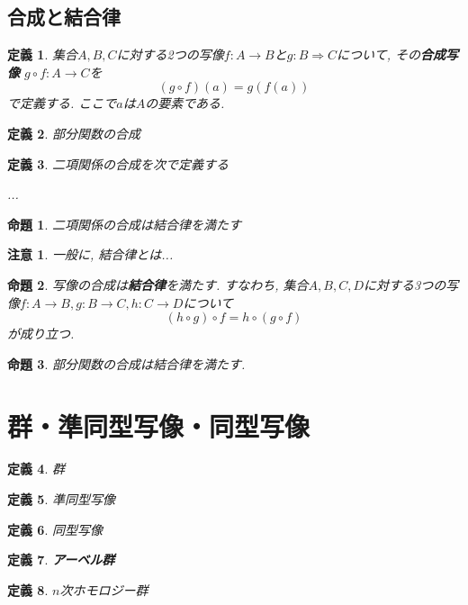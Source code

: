 \documentclass{jsbook}
\theoremstyle{plain}
\newtheorem{Def}{定義}[chapter]
\newtheorem{Prop}{命題}[chapter]
\newtheorem{caution}{注意}[chapter]
\begin{document}
\subsection{合成と結合律}
\begin{Def}
集合$A,B,C$に対する2つの写像$f:A\rightarrow B$と$g:B\Rightarrow C$について, その{\bf 合成写像} $g\circ f:A\rightarrow C$を
\[
(g\circ f)(a)=g(f(a))
\]
で定義する. ここで$a$は$A$の要素である.
\end{Def}
\begin{Def}
部分関数の合成
\end{Def}
\begin{Def}
二項関係の合成を次で定義する

...
\end{Def}
\begin{Prop}
二項関係の合成は結合律を満たす
\end{Prop}
\begin{caution}
一般に, 結合律とは...
\end{caution}
\begin{Prop}
写像の合成は{\bf 結合律}を満たす.
すなわち, 集合$A,B,C,D$に対する3つの写像$f:A\rightarrow B, g:B\rightarrow C,
h:C\rightarrow D$について
\[
(h\circ g)\circ f=h\circ(g\circ f)
\]
が成り立つ.
\end{Prop}
\begin{Prop}
部分関数の合成は結合律を満たす.
\end{Prop}
\section{群・準同型写像・同型写像}
\begin{Def}
群
\end{Def}
\begin{Def}
準同型写像
\end{Def}
\begin{Def}
同型写像
\end{Def}
\begin{Def}
{\bf アーベル群}
\end{Def}
\begin{Def}
$n$次ホモロジー群
\end{Def}
\end{document}
